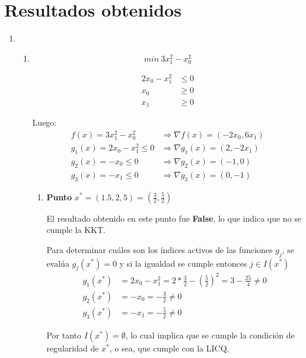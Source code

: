 \documentclass[titlepage, 11pt]{scrartcl}
\begin{document}
	
	
	\vspace{1cm}
	\section{Resultados obtenidos}

\begin{enumerate}
	\item 
	\begin{enumerate}
		\item \begin{equation*}
		min \ 3x_1^2 - x_0^2
		\end{equation*}
		
		\begin{align*}
		2x_0 - x_1^2 &\leq 0\\
		x_0 &\geq 0\\
		x_1 &\geq 0
		\end{align*}
		
		Luego:
		\begin{align*}
		f(x) = 3x_1^2 - x_0^2 &\Rightarrow \nabla f(x) = (-2x_0, 6x_1)\\
		g_1(x) = 2x_0 - x_1^2 \leq 0 &\Rightarrow \nabla g_1(x) = (2, -2x_1)\\
		g_2(x) = -x_0 \leq 0 &\Rightarrow \nabla g_2(x) = (-1, 0)\\
		g_3(x) =  -x_1 \leq 0 &\Rightarrow \nabla g_3(x) = (0, -1)
		\end{align*}
		
		\vspace{7mm}
		\begin{enumerate}
			\item \textbf{Punto} $x^* = (1.5, 2,5) = (\frac{3}{2}, \frac{5}{2})$
			
			El resultado obtenido en este punto fue \textbf{False}, lo que indica que no se cumple la KKT.
			
			Para determinar cuáles son los \'indices activos de las funciones $g_j$, se eval\'ua  $g_j(x^*) = 0$ y si la igualdad se cumple entonces $j \in I(x^*)$
			\begin{align*}
			g_1(x^*) &= 2x_0 - x_1^2 = 2 * \frac{3}{2} - (\frac{5}{2})^2 = 3 - \frac{25}{4} \neq 0\\
			g_2(x^*) &= -x_0 = - \frac{3}{2} \neq 0\\
			g_3(x^*) &= -x_1 = - \frac{5}{2} \neq 0
			\end{align*}
			
			Por tanto $I(x^*)  = \emptyset$, lo cual implica que se cumple la condici\'on de regularidad de $x^*$, o sea, que cumple con la LICQ.
			

\end{enumerate}
\end{enumerate}
\end{enumerate}
\end{document}
